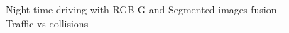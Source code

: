 \begin{figure}[!ht]
    \centering
    \def\svgwidth{0.5\textwidth}
    
    \caption{Night time driving with RGB-G and Segmented images fusion - Traffic vs
    collisions}
    \label{fig:224kdatafusionnight}
\end{figure}

